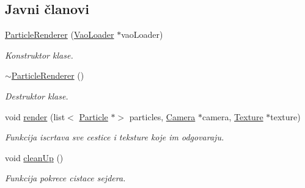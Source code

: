 \subsection*{Javni članovi}
\begin{DoxyCompactItemize}
\item 
\hyperlink{classparticle_1_1ParticleRenderer_a2cb5f823b59a1ffe522fdbdaccfd2b89}{Particle\+Renderer} (\hyperlink{classcore_1_1VaoLoader}{Vao\+Loader} $\ast$vao\+Loader)
\begin{DoxyCompactList}\small\item\em Konstruktor klase. \end{DoxyCompactList}\item 
\hyperlink{classparticle_1_1ParticleRenderer_abefba4a851f58fd2d4c63d4d0a6aae09}{$\sim$\+Particle\+Renderer} ()
\begin{DoxyCompactList}\small\item\em Destruktor klase. \end{DoxyCompactList}\item 
void \hyperlink{classparticle_1_1ParticleRenderer_a261a071f85666b30884da7fefa13c383}{render} (list$<$ \hyperlink{classparticle_1_1Particle}{Particle} $\ast$$>$ particles, \hyperlink{classentity_1_1Camera}{Camera} $\ast$camera, \hyperlink{classtexture_1_1Texture}{Texture} $\ast$texture)
\begin{DoxyCompactList}\small\item\em Funkcija iscrtava sve cestice i teksture koje im odgovaraju. \end{DoxyCompactList}\item 
void \hyperlink{classparticle_1_1ParticleRenderer_a42823bfdbfdad50b7ef4e55286526cef}{clean\+Up} ()
\begin{DoxyCompactList}\small\item\em Funkcija pokrece cistace sejdera. \end{DoxyCompactList}\end{DoxyCompactItemize}
